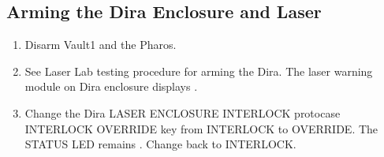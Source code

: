 \documentclass[letterpaper,10pt,english]{sphinxmanual}
\begin{document}
\subsection{Arming the Dira Enclosure and Laser}
\label{\detokenize{testing_documentation/Vault-1_laser:arming-the-dira-enclosure-and-laser}}\begin{enumerate}
%
\item {} 
\sphinxAtStartPar
Disarm Vault\sphinxhyphen{}1 and the Pharos.

\item {} 
\sphinxAtStartPar
See Laser Lab testing procedure for arming the Dira.
The laser warning module on Dira enclosure displays .

\item {} 
\sphinxAtStartPar
Change the Dira LASER ENCLOSURE INTERLOCK protocase INTERLOCK OVERRIDE key from INTERLOCK to OVERRIDE.
The STATUS LED remains . Change back to INTERLOCK.

\end{enumerate}
\end{document}
